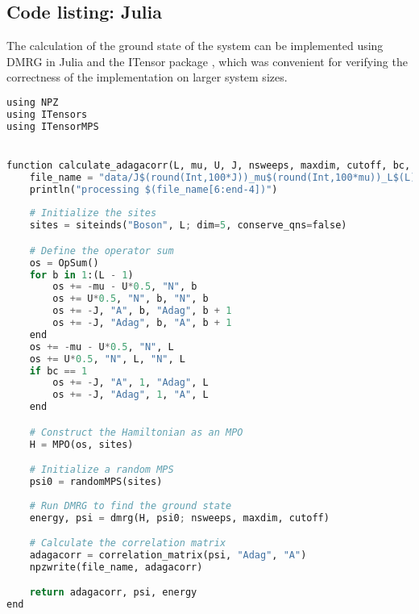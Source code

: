 \begin{widetext}
\section{Code listing: Julia} \label{app:codesP}

The calculation of the ground state of the system can be implemented using DMRG in Julia and the ITensor package \cite{Fishman_2022}, which was convenient for verifying the correctness of the implementation on larger system sizes.
\begin{lstlisting}[language=Python]
using NPZ
using ITensors
using ITensorMPS


function calculate_adagacorr(L, mu, U, J, nsweeps, maxdim, cutoff, bc, nc)
    file_name = "data/J$(round(Int,100*J))_mu$(round(Int,100*mu))_L$(L)_bc$(bc)_nc$(nc)_sweeps$(nsweeps)_dim$(maxdim[1]).npy"
    println("processing $(file_name[6:end-4])")
    
    # Initialize the sites
    sites = siteinds("Boson", L; dim=5, conserve_qns=false)

    # Define the operator sum
    os = OpSum()
    for b in 1:(L - 1)
        os += -mu - U*0.5, "N", b
        os += U*0.5, "N", b, "N", b
        os += -J, "A", b, "Adag", b + 1
        os += -J, "Adag", b, "A", b + 1
    end
    os += -mu - U*0.5, "N", L
    os += U*0.5, "N", L, "N", L
    if bc == 1
        os += -J, "A", 1, "Adag", L
        os += -J, "Adag", 1, "A", L
    end

    # Construct the Hamiltonian as an MPO
    H = MPO(os, sites)

    # Initialize a random MPS
    psi0 = randomMPS(sites)
    
    # Run DMRG to find the ground state
    energy, psi = dmrg(H, psi0; nsweeps, maxdim, cutoff)

    # Calculate the correlation matrix
    adagacorr = correlation_matrix(psi, "Adag", "A")
    npzwrite(file_name, adagacorr)

    return adagacorr, psi, energy
end
\end{lstlisting}
\end{widetext}
